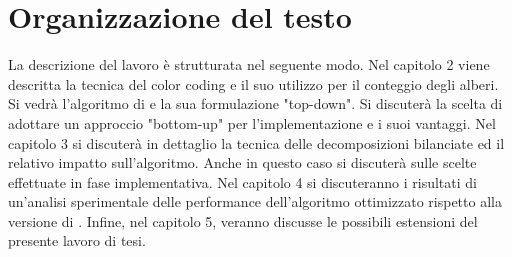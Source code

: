 \section{Organizzazione del testo}

La descrizione del lavoro \`e strutturata nel seguente modo.
Nel capitolo 2 viene descritta la tecnica del color coding e il suo utilizzo per il conteggio degli alberi.
Si vedr\`a l'algoritmo di \cite{bressan2018motif} e la sua formulazione "top-down". Si discuter\`a la scelta di adottare un approccio "bottom-up" per l'implementazione e i suoi vantaggi.
Nel capitolo 3 si discuter\`a in dettaglio la tecnica delle decomposizioni bilanciate ed il relativo impatto sull'algoritmo. Anche in questo caso si discuter\`a sulle scelte effettuate in fase implementativa.
Nel capitolo 4 si discuteranno i risultati di un'analisi sperimentale delle performance dell'algoritmo ottimizzato rispetto alla versione di \cite{bressan2018motif}.
Infine, nel capitolo 5, veranno discusse le possibili estensioni del presente lavoro di tesi.
